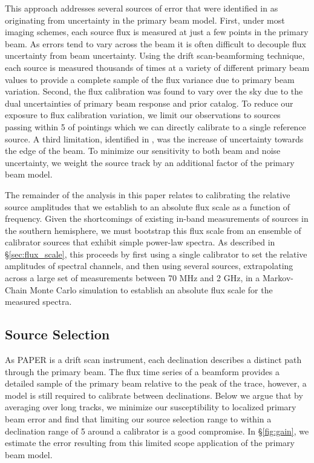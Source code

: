 \documentclass[preprint]{aastex}
\begin{document}
This approach addresses several sources of error that were identified in \citet{Jacobs:2013p9908} 
as originating from uncertainty in the primary beam model.
  First, under most imaging schemes, each source flux is measured at just a few 
points in the primary beam. As errors tend to vary across the beam it is often
 difficult to decouple flux uncertainty from beam uncertainty.
 Using the drift scan-beamforming technique, each 
source is measured thousands of times at a variety of different primary beam values to provide a complete sample of the
flux variance due to primary beam variation.  Second, the flux calibration was found to vary over the 
sky due to the dual uncertainties of primary beam response and prior catalog. To reduce our exposure to flux calibration
variation, we limit our observations to sources passing within 5\arcdeg{}  of pointings which we can directly calibrate
to a single reference source.
 A third limitation, identified in \citet{Williams:2012p8768},
was the increase of uncertainty towards the edge of the beam. To minimize our sensitivity to both beam and noise
uncertainty, we weight the source track by an additional factor of the primary beam model.  

The remainder of the analysis in this paper relates to calibrating the relative source amplitudes that we
establish to an absolute flux scale as a function of frequency.  Given the shortcomings of 
existing in-band measurements of sources
in the southern hemisphere, we must bootstrap this flux scale from an ensemble of calibrator sources that
exhibit simple power-law spectra.
As described in \S\ref{sec:flux_scale},
this proceeds by first using a single calibrator to set the relative amplitudes of spectral channels, and
then using several sources, extrapolating across a large set of measurements 
between 70 MHz and 2 GHz, in a Markov-Chain Monte Carlo simulation to establish an absolute flux scale
for the measured spectra.


\subsection{Source Selection} 
As PAPER is a drift scan instrument, each declination describes a distinct path through the primary beam. The flux time series of a beamform
 provides a detailed sample of the primary beam relative to the peak of the trace, however,
a model is still required to calibrate between declinations. Below we argue that by averaging over long tracks, we minimize our 
susceptibility to localized primary beam error and find that limiting our source selection range to within 
a declination range of 5\arcdeg{} around a calibrator is a good compromise. In \S\ref{fig:gain},
we estimate the error resulting from this limited scope application of the primary beam model.
\end{document}
